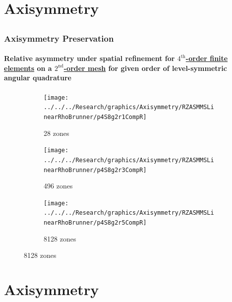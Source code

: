 \documentclass[compress,t]{beamer}
\begin{document}
\section{Axisymmetry}
\subsection{}

\begin{frame}
\frametitle{Axisymmetry Preservation}
\framesubtitle{Relative asymmetry under spatial refinement for \underline{$4^\text{th}$-order finite elements} on a \underline{$2^\text{nd}$-order mesh} for given order of level-symmetric angular quadrature}

\begin{figure}
\centering
\begin{subfigure}{0.33\textwidth}
\centering
\texttt{[image: ../../../Research/graphics/Axisymmetry/RZASMMSLinearRhoBrunner/p4S8g2r1CompR]}
\caption{28 zones}
\end{subfigure}%
\begin{subfigure}{0.33\textwidth}
\centering
\texttt{[image: ../../../Research/graphics/Axisymmetry/RZASMMSLinearRhoBrunner/p4S8g2r3CompR]}
\caption{496 zones}
\end{subfigure}%
\begin{subfigure}{0.33\textwidth}
\centering
\texttt{[image: ../../../Research/graphics/Axisymmetry/RZASMMSLinearRhoBrunner/p4S8g2r5CompR]}
\caption{8128 zones}
\end{subfigure}
\end{figure}

\end{frame}

\section{Axisymmetry}
\subsection{}
\end{document}
